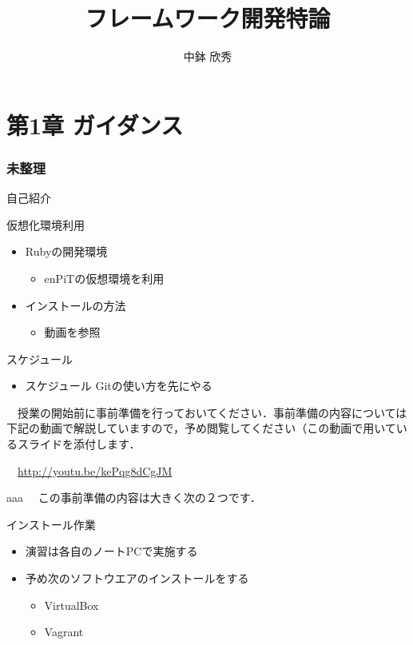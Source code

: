 \documentclass[t, aspectratio=169]{beamer}
\date{\insertpart}
\institute[AIIT]{産業技術大学院大学(AIIT)}
\author{中鉢 欣秀}
\date{}
\title{フレームワーク開発特論}
\begin{document}
\maketitle


\part{第1章 ガイダンス}
\label{sec-1}
\section{未整理}
\label{sec-1-1}
\begin{frame}[label=sec-1-1-1]{自己紹介}
\end{frame}

\begin{frame}[label=sec-1-1-2]{仮想化環境利用}
\begin{itemize}
\item Rubyの開発環境
\begin{itemize}
\item enPiTの仮想環境を利用
\end{itemize}
\item インストールの方法
\begin{itemize}
\item 動画を参照
\end{itemize}
\end{itemize}
\end{frame}

\begin{frame}[label=sec-1-1-3]{スケジュール}
\begin{itemize}
\item スケジュール
Gitの使い方を先にやる
\end{itemize}

　授業の開始前に事前準備を行っておいてください．事前準備の内容については下記の動画で解説していますので，予め閲覧してください（この動画で用いているスライドを添付します．

　\url{http://youtu.be/kePqg8dCgJM}
\end{frame}

\begin{frame}[label=sec-1-1-4]{aaa}
　この事前準備の内容は大きく次の２つです．
\end{frame}

\begin{frame}[label=sec-1-1-5]{インストール作業}
\begin{itemize}
\item 演習は各自のノートPCで実施する
\item 予め次のソフトウエアのインストールをする
\begin{itemize}
\item VirtualBox
\item Vagrant
\end{itemize}
\end{itemize}
\end{frame}
\end{document}
